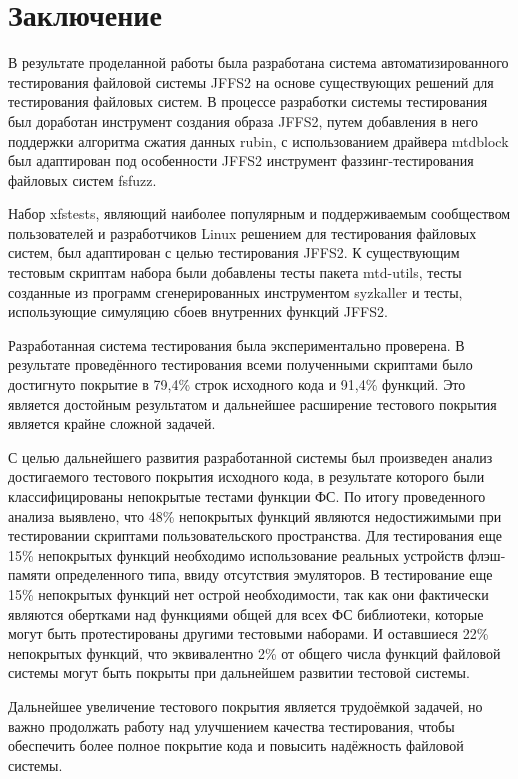 \section{Заключение}
\label{sec:Chapter5} 

В результате проделанной работы была разработана система автоматизированного тестирования файловой системы JFFS2 на основе существующих решений для тестирования файловых систем. В процессе разработки системы тестирования был доработан инструмент создания образа JFFS2, путем добавления в него поддержки алгоритма сжатия данных rubin, с использованием драйвера mtdblock был адаптирован под особенности JFFS2 инструмент фаззинг-тестирования файловых систем fsfuzz. 

Набор xfstests, являющий наиболее популярным и поддерживаемым сообществом пользователей и разработчиков Linux решением для тестирования файловых систем, был адаптирован с целью тестирования JFFS2. К существующим тестовым скриптам набора были добавлены тесты пакета mtd-utils, тесты созданные из программ сгенерированных инструментом syzkaller и тесты, использующие симуляцию сбоев внутренних функций JFFS2.

Разработанная система тестирования была экспериментально проверена. В результате проведённого тестирования всеми полученными скриптами было достигнуто покрытие в 79,4\% строк исходного кода и 91,4\% функций. Это является достойным результатом и дальнейшее расширение тестового покрытия является крайне сложной задачей.

С целью дальнейшего развития разработанной системы был произведен анализ достигаемого тестового покрытия исходного кода, в результате которого были классифицированы непокрытые тестами функции ФС. По итогу проведенного анализа выявлено, что 48\% непокрытых функций являются недостижимыми при тестировании скриптами пользовательского пространства. Для тестирования еще 15\% непокрытых функций необходимо использование реальных устройств флэш-памяти определенного типа, ввиду отсутствия эмуляторов. В тестирование еще 15\% непокрытых функций нет острой необходимости, так как они фактически являются обертками над функциями общей для всех ФС библиотеки, которые могут быть протестированы другими тестовыми наборами. И оставшиеся 22\% непокрытых функций, что эквивалентно 2\% от общего числа функций файловой системы могут быть покрыты при дальнейшем развитии тестовой системы. 

Дальнейшее увеличение тестового покрытия является трудоёмкой задачей, но важно продолжать работу над улучшением качества тестирования, чтобы обеспечить более полное покрытие кода и повысить надёжность файловой системы.

\newpage
